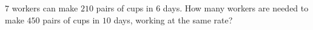$7$ workers can make $210$ pairs of cups in $6$ days. How many workers are needed to make $450$ pairs of cups in $10$ days, working at the same rate?
